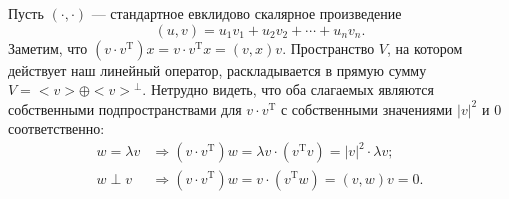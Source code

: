 \documentclass{article}
\begin{document}
Пусть $(\cdot,\cdot)$ --- стандартное евклидово скалярное произведение
$$(u,v) = u_1 v_1 + u_2 v_2 + \cdots + u_n v_n.$$
Заметим, что $(v \cdot v^{\mathrm{T}})x = v \cdot v^{\mathrm{T}} x = (v,x)v$. Пространство $V$, на котором действует наш линейный оператор, 
раскладывается в прямую сумму $V = < v > \oplus {< v >}^\perp$. Нетрудно видеть, что оба слагаемых являются собственными подпространствами для 
$v \cdot v^{\mathrm{T}}$ с собственными значениями $|v|^2$ и $0$ соответственно:
\begin{align*}
w = \lambda v &\Rightarrow (v \cdot v^{\mathrm{T}})w = \lambda v \cdot (v^{\mathrm{T}} v) = |v|^2 \cdot \lambda v;\\
w \perp v &\Rightarrow (v \cdot v^{\mathrm{T}})w = v \cdot (v^{\mathrm{T}} w) = (v,w)v = 0.
\end{align*}
\end{document}
